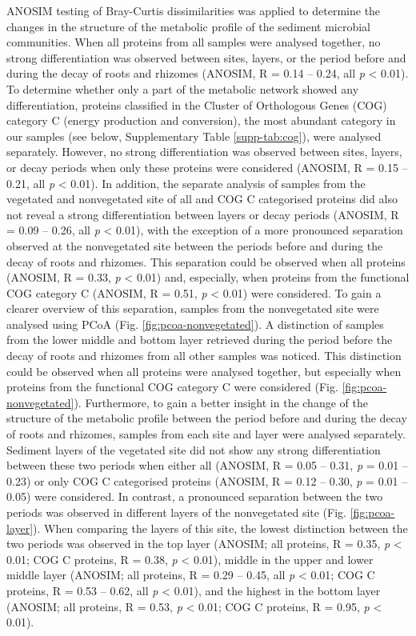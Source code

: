 \documentclass[
  12 pt,
]{article}
\begin{document}
ANOSIM testing of Bray-Curtis dissimilarities was applied to determine the changes in the structure of the metabolic profile of the sediment microbial communities. When all proteins from all samples were analysed together, no strong differentiation was observed between sites, layers, or the period before and during the decay of roots and rhizomes (ANOSIM, R = 0.14 -- 0.24, all \emph{p} \textless{} 0.01). To determine whether only a part of the metabolic network showed any differentiation, proteins classified in the Cluster of Orthologous Genes (COG) category C (energy production and conversion), the most abundant category in our samples (see below, Supplementary Table \ref{supp-tab:cog}), were analysed separately. However, no strong differentiation was observed between sites, layers, or decay periods when only these proteins were considered (ANOSIM, R = 0.15 -- 0.21, all \emph{p} \textless{} 0.01). In addition, the separate analysis of samples from the vegetated and nonvegetated site of all and COG C categorised proteins did also not reveal a strong differentiation between layers or decay periods (ANOSIM, R = 0.09 -- 0.26, all \emph{p} \textless{} 0.01), with the exception of a more pronounced separation observed at the nonvegetated site between the periods before and during the decay of roots and rhizomes. This separation could be observed when all proteins (ANOSIM, R = 0.33, \emph{p} \textless{} 0.01) and, especially, when proteins from the functional COG category C (ANOSIM, R = 0.51, \emph{p} \textless{} 0.01) were considered. To gain a clearer overview of this separation, samples from the nonvegetated site were analysed using PCoA (Fig. \ref{fig:pcoa-nonvegetated}). A distinction of samples from the lower middle and bottom layer retrieved during the period before the decay of roots and rhizomes from all other samples was noticed. This distinction could be observed when all proteins were analysed together, but especially when proteins from the functional COG category C were considered (Fig. \ref{fig:pcoa-nonvegetated}). Furthermore, to gain a better insight in the change of the structure of the metabolic profile between the period before and during the decay of roots and rhizomes, samples from each site and layer were analysed separately. Sediment layers of the vegetated site did not show any strong differentiation between these two periods when either all (ANOSIM, R = 0.05 -- 0.31, \emph{p} = 0.01 -- 0.23) or only COG C categorised proteins (ANOSIM, R = 0.12 -- 0.30, \emph{p} = 0.01 -- 0.05) were considered. In contrast, a pronounced separation between the two periods was observed in different layers of the nonvegetated site (Fig. \ref{fig:pcoa-layer}). When comparing the layers of this site, the lowest distinction between the two periods was observed in the top layer (ANOSIM; all proteins, R = 0.35, \emph{p} \textless{} 0.01; COG C proteins, R = 0.38, \emph{p} \textless{} 0.01), middle in the upper and lower middle layer (ANOSIM; all proteins, R = 0.29 -- 0.45, all \emph{p} \textless{} 0.01; COG C proteins, R = 0.53 -- 0.62, all \emph{p} \textless{} 0.01), and the highest in the bottom layer (ANOSIM; all proteins, R = 0.53, \emph{p} \textless{} 0.01; COG C proteins, R = 0.95, \emph{p} \textless{} 0.01).
\end{document}
